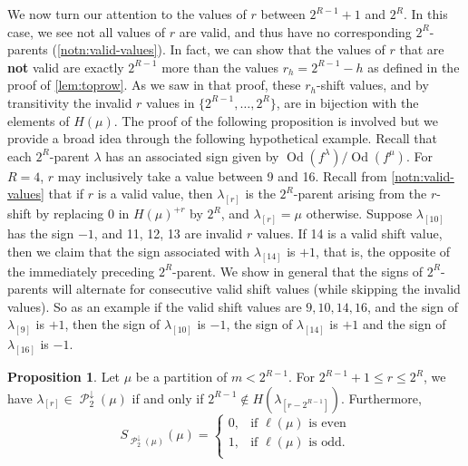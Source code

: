 \documentclass[12pt]{amsart}
\theoremstyle{definition}
\newtheorem{proposition}[theorem]{Proposition}
\numberwithin{equation}{section}
\newcommand{\la}{\lambda}
\DeclareMathOperator{\p}{\mathcal{P}}
\DeclareMathOperator{\Od}{Od}
\begin{document}
We now turn our attention to the values of $r$ between $2^{R-1}+1$ and $2^R$. In this case, we see not all values of $r$ are valid, and thus have no corresponding $2^R$-parents (\cref{notn:valid-values}). In fact, we can show that the values of $r$ that are \textbf{not} valid are exactly $2^{R-1}$ more than the values $r_h = 2^{R-1}-h$ as defined in the proof of \cref{lem:toprow}. As we saw in that proof, these $r_h$-shift values, and by transitivity the invalid $r$ values in $\{2^{R-1}, \ldots, 2^{R}\}$, are in bijection with the elements of $H(\mu)$. The proof of the following proposition is involved but we provide a broad idea through the following hypothetical example. Recall that each $2^R$-parent $\la$ has an associated sign given by $\Od(f^\la)/\Od(f^\mu)$. For $R = 4$, $r$ may inclusively take a value between 9 and 16. Recall from \cref{notn:valid-values} that if $r$ is a valid value, then $\la_{[r]}$ is the $2^R$-parent arising from the $r$-shift by replacing $0$ in $H(\mu)^{+r}$ by $2^R$, and $\la_{[r]} = \mu$ otherwise. Suppose $\la_{[10]}$ has the sign $-1$, and 11, 12, 13 are invalid $r$ values. If 14 is a valid shift value, then we claim that the sign associated with $\la_{[14]}$ is $+1$, that is, the opposite of the immediately preceding $2^R$-parent. We show in general that the signs of $2^R$-parents will alternate for consecutive valid shift values (while skipping the invalid values). So as an example if the valid shift values are $9, 10, 14, 16$, and the sign of $\la_{[9]}$ is $+1$, then the sign of $\la_{[10]}$ is $-1$, the sign of $\la_{[14]}$ is $+1$ and the sign of $\la_{[16]}$  is $-1$. 
\begin{proposition}\label{lem:bottomrow}
Let $\mu$ be a partition of $m < 2^{R-1}$.
For $2^{R-1}+ 1 \leq r \leq 2^R$, we have $\lambda_{[r]} \in \p_2^\downarrow(\mu)$ if and only if $2^{R-1}\not\in H(\lambda_{[r-2^{R-1}]})$. Furthermore, \vspace*{-5pt}
\[
S_{\p_2^\downarrow(\mu)}(\mu) = \begin{cases}
0, &\text{if }\ell(\mu) \text{ is even}\\
1, &\text{if } \ell(\mu) \text{ is odd}.\\
\end{cases}
\]
\end{proposition}
\end{document}
